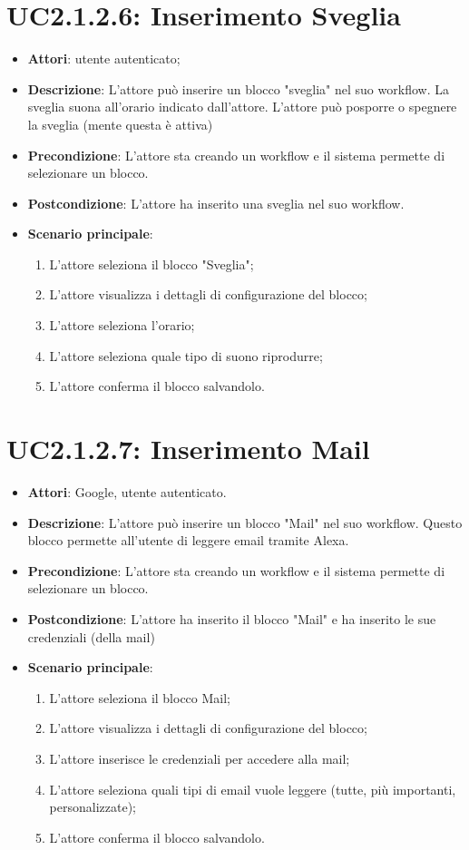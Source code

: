 \section{UC2.1.2.6: Inserimento Sveglia}
\label{UC2.1.2.6}
\begin{itemize}
	\item \textbf{Attori}: utente autenticato;
	\item \textbf{Descrizione}: L'attore può inserire un blocco "sveglia" nel suo workflow. La sveglia suona all'orario indicato dall'attore. L'attore può posporre o spegnere la sveglia (mente questa è attiva)
	\item \textbf{Precondizione}: L'attore sta creando un workflow e il sistema permette di selezionare un blocco.
	\item \textbf{Postcondizione}: L'attore ha inserito una sveglia nel suo workflow.
	\item \textbf{Scenario principale}:
	\begin{enumerate} \item L'attore seleziona il blocco "Sveglia";  \item L'attore visualizza i dettagli di configurazione del blocco; \item L'attore seleziona l'orario;  \item  L'attore seleziona quale tipo di suono riprodurre; \item L'attore conferma il blocco salvandolo. \end{enumerate}
\end{itemize}

\section{UC2.1.2.7: Inserimento Mail}
\label{UC2.1.2.7}
\begin{itemize}
	\item \textbf{Attori}: Google, utente autenticato.
	\item \textbf{Descrizione}: L'attore può inserire un blocco "Mail" nel suo workflow. Questo blocco permette all'utente di leggere email tramite Alexa.
	\item \textbf{Precondizione}: L'attore sta creando un workflow e il sistema permette di selezionare un blocco.
	\item \textbf{Postcondizione}: L'attore ha inserito il blocco "Mail" e ha inserito le sue credenziali (della mail)
	\item \textbf{Scenario principale}:
	\begin{enumerate} \item L'attore seleziona il blocco Mail;  \item L'attore visualizza i dettagli di configurazione del blocco; \item  L'attore inserisce le credenziali per accedere alla mail;  \item  L'attore seleziona quali tipi di email vuole leggere (tutte, più importanti, personalizzate); \item L'attore conferma il blocco salvandolo.\end{enumerate}
\end{itemize}

